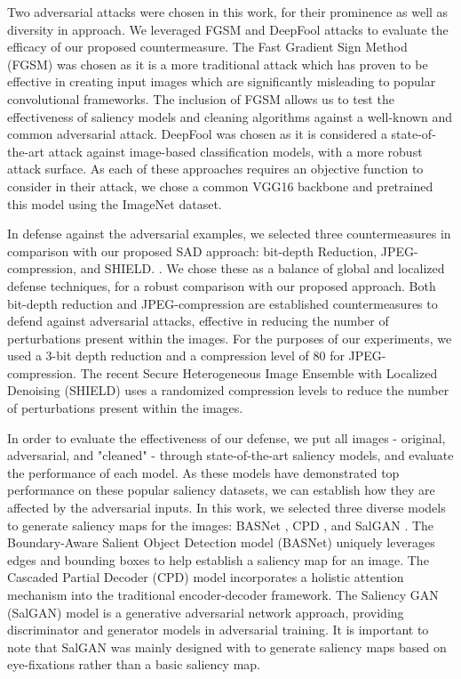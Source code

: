 \documentclass[10pt,twocolumn,letterpaper]{article}
\begin{document}
Two adversarial attacks were chosen in this work, for their prominence as well as diversity in approach.
We leveraged FGSM \cite{FGSM} and DeepFool \cite{deepfool} attacks to evaluate the efficacy of our proposed countermeasure.
The Fast Gradient Sign Method (FGSM) \cite{FGSM} was chosen as it is a more traditional attack which has proven to be effective in creating input images which are significantly misleading to popular convolutional frameworks. 
The inclusion of FGSM \cite{FGSM} allows us to test the effectiveness of saliency models and cleaning algorithms against a well-known and common adversarial attack. 
DeepFool \cite{deepfool} was chosen as it is considered a state-of-the-art attack against image-based classification models, with a more robust attack surface.
As each of these approaches requires an objective function to consider in their attack, we chose a common VGG16\cite{vgg16} backbone and pretrained this model using the ImageNet \cite{imagenet_cvpr09} dataset.


In defense against the adversarial examples, we selected three countermeasures in comparison with our proposed SAD approach: bit-depth Reduction, JPEG-compression, and SHIELD. \cite{das2018shield}.
We chose these as a balance of global and localized defense techniques, for a robust comparison with our proposed approach.
Both bit-depth reduction and JPEG-compression are established countermeasures to defend against adversarial attacks, effective in reducing the number of perturbations present within the images. 
For the purposes of our experiments, we used a 3-bit depth reduction and a compression level of 80 for JPEG-compression.
The recent Secure Heterogeneous Image Ensemble with Localized Denoising (SHIELD) \cite{das2018shield} uses a randomized compression levels to reduce the number of perturbations present within the images.

In order to evaluate the effectiveness of our defense, we put all images - original, adversarial, and "cleaned" - through state-of-the-art saliency models, and evaluate the performance of each model.
As these models have demonstrated top performance on these popular saliency datasets, we can establish how they are affected by the adversarial inputs.
In this work, we selected three diverse models to generate saliency maps for the images: BASNet \cite{BASNet}, CPD \cite{wu2019cascaded}, and SalGAN \cite{Pan_2017_SalGAN}. 
The Boundary-Aware Salient Object Detection model (BASNet) \cite{BASNet} uniquely leverages edges and bounding boxes to help establish a saliency map for an image.
The Cascaded Partial Decoder (CPD) \cite{wu2019cascaded} model incorporates a holistic attention mechanism into the traditional encoder-decoder framework. 
The Saliency GAN (SalGAN) \cite{Pan_2017_SalGAN} model is a generative adversarial network approach, providing discriminator and generator models in adversarial training.
It is important to note that SalGAN \cite{Pan_2017_SalGAN} was mainly designed with to generate saliency maps based on eye-fixations rather than a basic saliency map. 
\end{document}
